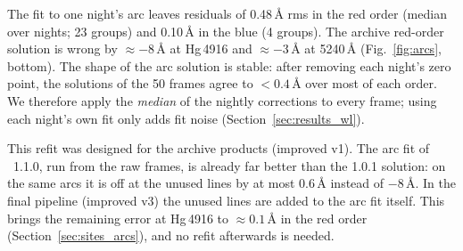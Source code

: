 The fit to one night's arc leaves residuals of 0.48\,\AA{} rms in the red order (median over nights; 23 groups) and
0.10\,\AA{} in the blue (4 groups). The archive red-order solution is wrong by $\approx-8$\,\AA{} at Hg\,4916 and
$\approx-3$\,\AA{} at 5240\,\AA{} (Fig.~\ref{fig:arcs}, bottom). The shape of the arc solution is stable: after
removing each night's zero point, the solutions of the 50 frames agree to $<0.4$\,\AA{} over most of each order. We
therefore apply the \emph{median} of the nightly corrections to every frame; using each night's own fit only adds fit
noise (Section~\ref{sec:results_wl}).

This refit was designed for the archive products (improved v1). The arc fit of \banzai{}~1.1.0, run from the raw
frames, is already far better than the 1.0.1 solution: on the same arcs it is off at the unused lines by at most
0.6\,\AA{} instead of $-8$\,\AA. In the final pipeline (improved v3) the unused lines are added to the arc fit itself.
This brings the remaining error at Hg\,4916 to $\approx0.1$\,\AA{} in the red order (Section~\ref{sec:sites_arcs}),
and no refit afterwards is needed.

